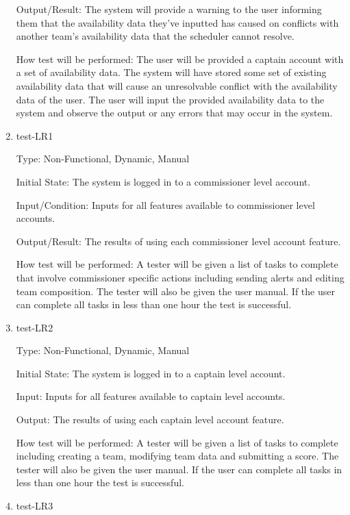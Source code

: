 \documentclass[12pt, titlepage]{article}
\begin{document}
\begin{enumerate}
  Output/Result: The system will provide a warning to the user informing them that
  the availability data they've inputted has caused on conflicts with another team's
  availability data that the scheduler cannot resolve.
            
  How test will be performed: The user will be provided a captain account with a set 
  of availability data. The system will have stored some set of existing availability 
  data that will cause an unresolvable conflict with the availability data of the user.
  The user will input the provided availability data to the system and observe the 
  output or any errors that may occur in the system.

  \item{test-LR1\\}

  Type: Non-Functional, Dynamic, Manual

  Initial State: The system is logged in to a commissioner level account.

  Input/Condition: Inputs for all features available to commissioner 
  level accounts.

  Output/Result: The results of using each commissioner level account 
  feature.

  How test will be performed: A tester will be given a list of tasks to
  complete that involve commissioner specific actions including sending 
  alerts and editing team composition. 
  The tester will also be given the user manual. If the user can
  complete all tasks in less than one hour the test is successful.

  \item{test-LR2\\}

  Type: Non-Functional, Dynamic, Manual

  Initial State: The system is logged in to a captain level account.

  Input: Inputs for all features available to captain level accounts.

  Output: The results of using each captain level account feature.

  How test will be performed: A tester will be given a list of tasks to
  complete including creating a team, modifying team data and submitting a
  score. The tester will also be given the user manual. If the user can
  complete all tasks in less than one hour the test is successful.

  \item{test-LR3\\}


\end{enumerate}
\end{document}
